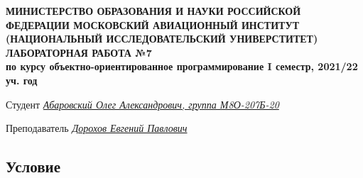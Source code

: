 \documentclass[12pt]{article}
\begin{document}
\begin{titlepage}
\begin{center}
\textbf{МИНИСТЕРСТВО ОБРАЗОВАНИЯ И НАУКИ РОССИЙСКОЙ ФЕДЕРАЦИИ
\medskip
МОСКОВСКИЙ АВИАЦИОННЫЙ ИНСТИТУТ
(НАЦИОНАЛЬНЫЙ ИССЛЕДОВАТЕЛЬСКИЙ УНИВЕРСТИТЕТ)
\vfill\vfill
{\Huge ЛАБОРАТОРНАЯ РАБОТА №7} \\
по курсу объектно-ориентированное программирование
I семестр, 2021/22 уч. год}
\end{center}
\vfill

Студент \uline{\it {Абаровский Олег Александрович, группа М8О-207Б-20}\hfill}

Преподаватель \uline{\it {Дорохов Евгений Павлович}\hfill}

\vfill
\end{titlepage}

\subsection*{Условие}
\end{document}
